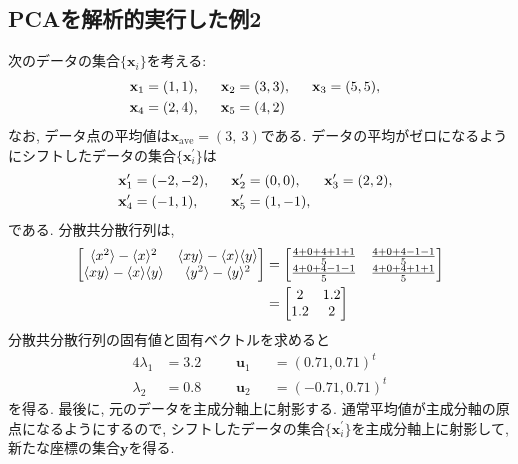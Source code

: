 \subsection{PCAを解析的実行した例2}
次のデータの集合$\{\mathbf{x}_{i}\}$を考える:
\begin{alignat}{3}
  \mathbf{x}_{1} &= (1,1),~~ &
  \mathbf{x}_{2} &= (3,3),~~ &
  \mathbf{x}_{3} &= (5,5),~~ \notag \\
  \mathbf{x}_{4} &= (2,4),~~ &
  \mathbf{x}_{5} &= (4,2)    &\notag
\end{alignat}
なお, データ点の平均値は$\mathbf{x}_{\mathrm{ave}}= (3,~3)$である. 
データの平均がゼロになるようにシフトしたデータの集合$\{\mathbf{x}_{i}^{\prime}\}$は
\begin{alignat}{3}
  \mathbf{x}_{1}^{\prime} &= (-2,-2),~~&
  \mathbf{x}_{2}^{\prime} &= (0,0),~~  &
  \mathbf{x}_{3}^{\prime} &= (2,2),~~  \notag \\
  \mathbf{x}_{4}^{\prime} &= (-1,1),~~ &
  \mathbf{x}_{5}^{\prime} &= (1,-1),   &\notag
\end{alignat}
である. 
分散共分散行列は, 
\begin{align}
  \begin{bmatrix}
    \langle x^{2} \rangle - \langle x \rangle^{2} &
    \langle xy    \rangle - \langle x \rangle \langle y \rangle \\
    \langle xy    \rangle - \langle x \rangle \langle y \rangle &
    \langle y^{2} \rangle - \langle y \rangle^{2}
  \end{bmatrix}
  &=
  \begin{bmatrix}
    \frac{4+0+4+1+1}{5} & \frac{4+0+4-1-1}{5} \\
    \frac{4+0+4-1-1}{5} & \frac{4+0+4+1+1}{5} \\
  \end{bmatrix}
  \notag \\ &=
  \begin{bmatrix}
    2   & 1.2 \\
    1.2 & 2
  \end{bmatrix}
  \notag
\end{align}
分散共分散行列の固有値と固有ベクトルを求めると
\begin{alignat}{4}
  \lambda_{1} &= 3.2 ~~~~&& \mathbf{u}_{1} &&= ( 0.71, 0.71)^{t} \\
  \lambda_{2} &= 0.8 ~~~~&& \mathbf{u}_{2} &&= (-0.71, 0.71)^{t}
\end{alignat}
を得る. 
最後に, 元のデータを主成分軸上に射影する. 
通常平均値が主成分軸の原点になるようにするので, シフトしたデータの集合$\{\mathbf{x}_{i}^{\prime}\}$を主成分軸上に射影して, 新たな座標の集合$\mathbf{y}$を得る. 
